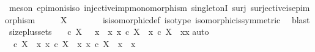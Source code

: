 \begin{isabellebody}
\ {\isacharparenleft}{\kern0pt}meson\ epi{\isacharunderscore}{\kern0pt}mon{\isacharunderscore}{\kern0pt}is{\isacharunderscore}{\kern0pt}iso\ injective{\isacharunderscore}{\kern0pt}imp{\isacharunderscore}{\kern0pt}monomorphism\ singletonI\ surj\ surjective{\isacharunderscore}{\kern0pt}is{\isacharunderscore}{\kern0pt}epimorphism{\isacharparenright}{\kern0pt}\isanewline
\ \ \isamarkupfalse%
\ \isamarkupfalse%
\ {\isachardoublequoteopen}X\ {\isasymcong}\ {\isasymOmega}{\isachardoublequoteclose}\isanewline
\ \ \ \ \isamarkupfalse%
\ is{\isacharunderscore}{\kern0pt}isomorphic{\isacharunderscore}{\kern0pt}def\ iso{\isacharunderscore}{\kern0pt}type\ isomorphic{\isacharunderscore}{\kern0pt}is{\isacharunderscore}{\kern0pt}symmetric\ \isamarkupfalse%
\ blast\isanewline
{}\isamarkupfalse%
%
\endisatagproof
{\isafoldproof}%
%
\isadelimproof
\isanewline
%
\endisadelimproof
\isanewline
{}\isamarkupfalse%
\ size{\isacharunderscore}{\kern0pt}{}plus{\isacharunderscore}{\kern0pt}sets{\isacharcolon}{\kern0pt}\isanewline
\ \ {\isachardoublequoteopen}{\isacharparenleft}{\kern0pt}{\isasymOmega}\ {\isasymle}\isactrlsub c\ X{\isacharparenright}{\kern0pt}\ {\isacharequal}{\kern0pt}\ {\isacharparenleft}{\kern0pt}{\isasymexists}\ x{}{\isachardot}{\kern0pt}\ {\isacharparenleft}{\kern0pt}{\isasymexists}\ x{}{\isachardot}{\kern0pt}\ {\isacharparenleft}{\kern0pt}{\isacharparenleft}{\kern0pt}x{}\ {\isasymin}\isactrlsub c\ X{\isacharparenright}{\kern0pt}\ {\isasymand}\ {\isacharparenleft}{\kern0pt}x{}\ {\isasymin}\isactrlsub c\ X{\isacharparenright}{\kern0pt}\ {\isasymand}\ {\isacharparenleft}{\kern0pt}x{}{\isasymnoteq}x{}{\isacharparenright}{\kern0pt}{\isacharparenright}{\kern0pt}{\isacharparenright}{\kern0pt}{\isacharparenright}{\kern0pt}{\isachardoublequoteclose}\isanewline
%
\isadelimproof
%
\endisadelimproof
%
\isatagproof
{}\isamarkupfalse%
{\isacharparenleft}{\kern0pt}auto{\isacharparenright}{\kern0pt}\isanewline
\ \ \isamarkupfalse%
\ {\isachardoublequoteopen}{\isasymOmega}\ {\isasymle}\isactrlsub c\ X\ {\isasymLongrightarrow}\ {\isasymexists}x{}{\isachardot}{\kern0pt}\ x{}\ {\isasymin}\isactrlsub c\ X\ {\isasymand}\ {\isacharparenleft}{\kern0pt}{\isasymexists}x{}{\isachardot}{\kern0pt}\ x{}\ {\isasymin}\isactrlsub c\ X\ {\isasymand}\ x{}\ {\isasymnoteq}\ x{}{\isacharparenright}{\kern0pt}{\isachardoublequoteclose}\isanewline

\end{isabellebody}
